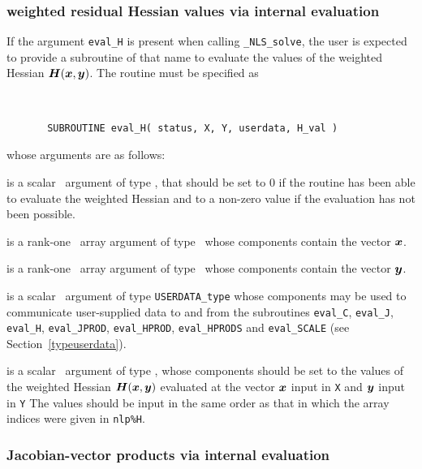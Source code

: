 \documentclass{galahad}
\newcommand{\packagename}{NLS}
\newcommand{\fullpackagename}{\libraryname\_\packagename}
\newcommand{\solver}{{\tt \fullpackagename\_solve}}
\begin{document}

\subsubsection{weighted residual Hessian values via internal evaluation\label{hfv}}

If the argument {\tt eval\_H} is present when calling \solver, the
user is expected to provide a subroutine of that name to evaluate the
values of the weighted Hessian ${\bm{H}}({\bm{x}},{\bm{y}})$.
The routine must be specified as

\def\baselinestretch{0.8}
{\tt
\begin{verbatim}
       SUBROUTINE eval_H( status, X, Y, userdata, H_val )
\end{verbatim} }
\def\baselinestretch{1.0}
\noindent whose arguments are as follows:

\begin{description}
 is a scalar \intentout\ argument of type \integer,
that should be set to 0 if the routine has been able to evaluate
the weighted Hessian
and to a non-zero value if the evaluation has not been possible.

 is a rank-one \intentin\ array argument of type \realdp\
whose components contain the vector ${\bm{x}}$.

 is a rank-one \intentin\ array argument of type \realdp\
whose components contain the vector ${\bm{y}}$.

 is a scalar \intentinout\ argument of type
{\tt USERDATA\_type} whose components may be used
to communicate user-supplied data to and from the subroutines
{\tt eval\_C}, {\tt eval\_J}, {\tt eval\_H}, {\tt eval\_JPROD},
{\tt eval\_HPROD}, {\tt eval\_HPRODS} and {\tt eval\_SCALE}
(see Section~\ref{typeuserdata}).

 is a scalar \intentout\ argument of type \realdp,
whose components should be set to the values
of the weighted Hessian ${\bm{H}}({\bm{x}},{\bm{y}})$
evaluated at the vector ${\bm{x}}$ input in {\tt X}
and ${\bm{y}}$ input in {\tt Y} The values should
be input in the same order as that in which the array indices were
given in {\tt nlp\%H}.

\end{description}


\subsubsection{Jacobian-vector products via internal evaluation\label{jvfv}}
\end{document}

